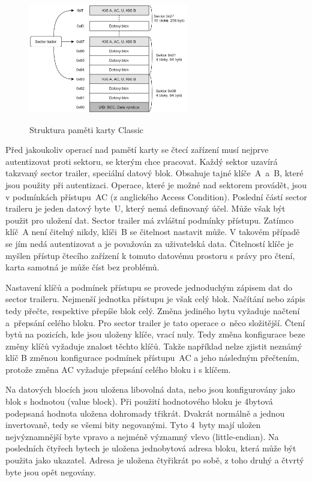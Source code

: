 \begin{figure}[ht]\centering
  \centering
  \hspace*{-0.07\linewidth}
  \includegraphics[width=0.6\linewidth,height=180px]{obrazky-figures/MemoryStructure.png}\\[1pt]  
  \caption{Struktura paměti karty Classic\cite{PracticalAttackOnMifare}}    
  \label{obrazekStrukturaPametiKarty}
\end{figure}

\par
Před jakoukoliv operací nad pamětí karty se čtecí zařízení musí nejprve autentizovat proti sektoru, se kterým chce pracovat. Každý sektor uzavírá takzvaný sector trailer, speciální datový blok. Obsahuje tajné klíče~A~a~B, které jsou použity při autentizaci. Operace, které je možné nad sektorem provádět, jsou v podmínkách přístupu~AC (z anglického Access Condition). Poslední částí sector traileru je jeden datový byte~U, který nemá definovaný účel. Může však být použit pro uložení dat. Sector trailer má zvláštní podmínky přístupu. Zatímco klíč~A není čitelný nikdy, klíči~B se čitelnost nastavit může. V takovém případě se jím nedá autentizovat a je považován za uživatelská data. Čitelností klíče je myšlen přístup čtecího zařízení k tomuto datovému prostoru s právy pro čtení, karta samotná je může číst bez problémů\cite{PracticalAttackOnMifare}. \par
Nastavení klíčů a podmínek přístupu se provede jednoduchým zápisem dat do sector traileru. Nejmenší jednotka přístupu je však celý blok. Načítání nebo zápis tedy přečte, respektive přepíše blok celý. Změna jediného bytu vyžaduje načtení a~přepsání celého bloku. Pro sector trailer je tato operace o~něco složitější. Čtení bytů na pozicích, kde jsou uloženy klíče, vrací nuly. Tedy změna konfigurace beze změny klíčů vyžaduje znalost těchto klíčů. Takže například nelze zjistit neznámý klíč B změnou konfigurace podmínek přístupu~AC a jeho následným přečtením, protože změna AC vyžaduje přepsání celého bloku i s klíčem\cite{makingTheBestOf}.
\par
Na datových blocích jsou uložena libovolná data, nebo jsou konfigurovány jako blok s hodnotou (value block). Při použití hodnotového bloku je 4bytová podepsaná hodnota uložena dohromady třikrát. Dvakrát normálně a jednou invertovaně, tedy se všemi bity negovanými. Tyto 4~byty mají uložen nejvýznamnější byte vpravo a nejméně významný vlevo ({little-endian}). Na posledních čtyřech bytech je uložena jednobytová adresa bloku, která může být použita jako ukazatel. Adresa je uložena čtyřikrát po sobě, z toho druhý a čtvrtý byte jsou opět negovány\cite{PracticalAttackOnMifare}.

